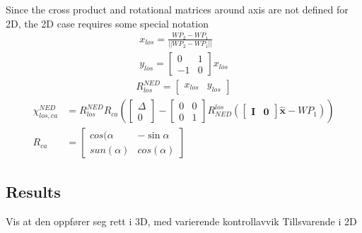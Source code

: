 Since the cross product and rotational matrices around axis are not defined for 2D, the 2D case requires some special notation
\begin{align}
    x_{los} = \frac{WP_2 - WP_1}{||WP_2 - WP_1||} \\
    y_{los} = \begin{bmatrix}0 & 1\\ -1 & 0 \end{bmatrix} x_{los}
\end{align}
\begin{align}
    R^{NED}_{los} = \begin{bmatrix} x_{los} & y_{los} \end{bmatrix}
\end{align}
\begin{align}
    \chi^{NED}_{los,ca} & = R^{NED}_{los}  R_{ca} \left(  \begin{bmatrix}\Delta \\ 0 \end{bmatrix} - \begin{bmatrix} 0 & 0  \\ 0 & 1  \end{bmatrix} R^{los}_{NED} (\begin{bmatrix} \mathbf{I} & \mathbf{0} \end{bmatrix} \hat{\textbf{x}} - WP_1) \right) \label{chi^los_los,ca}\\
    R_{ca} & = \begin{bmatrix}cos(\alpha & -\sin{\alpha}\\ sun(\alpha) & cos(\alpha) \end{bmatrix}
\end{align}

\subsection{Results}
        Vis at den oppfører seg rett i 3D, med varierende kontrollavvik
        Tillsvarende i 2D    